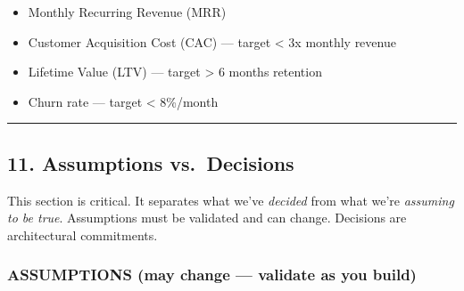 \documentclass[
  11pt,
]{article}
\providecommand{\tightlist}{%
  \setlength{\itemsep}{0pt}\setlength{\parskip}{0pt}}
\begin{document}
\begin{itemize}
\tightlist
\item
  Monthly Recurring Revenue (MRR)
\item
  Customer Acquisition Cost (CAC) --- target \textless{} 3x monthly
  revenue
\item
  Lifetime Value (LTV) --- target \textgreater{} 6 months retention
\item
  Churn rate --- target \textless{} 8\%/month
\end{itemize}

\begin{center}\rule{0.5\linewidth}{0.5pt}\end{center}

\hypertarget{assumptions-vs.-decisions}{%
\subsection{11. Assumptions
vs.~Decisions}\label{assumptions-vs.-decisions}}

This section is critical. It separates what we've \emph{decided} from
what we're \emph{assuming to be true}. Assumptions must be validated and
can change. Decisions are architectural commitments.

\hypertarget{assumptions-may-change-validate-as-you-build}{%
\subsubsection{ASSUMPTIONS (may change --- validate as you
build)}\label{assumptions-may-change-validate-as-you-build}}
\end{document}
